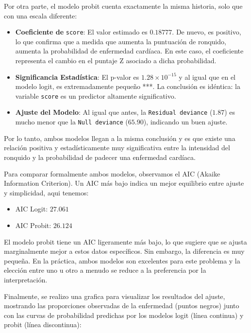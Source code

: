 Por otra parte, el modelo probit cuenta exactamente la misma historia, solo que con una escala diferente:

\begin{itemize}
    \item \textbf{Coeficiente de} \texttt{score}: El valor estimado es $0.18777$. De nuevo, es positivo, lo que confirma que a medida que aumenta la puntuación de ronquido, aumenta la probabilidad de enfermedad cardíaca. En este caso, el coeficiente representa el cambio en el puntaje Z asociado a dicha probabilidad.
    
    \item \textbf{Significancia Estadística}: El p-valor es $1.28 \times 10^{-15}$ y al igual que en el modelo logit, es extremadamente pequeño ***. La conclusión es idéntica: la variable \texttt{score} es un predictor altamente significativo.
    
    \item \textbf{Ajuste del Modelo}: Al igual que antes, la \texttt{Residual deviance} ($1.87$) es mucho menor que la \texttt{Null deviance} ($65.90$), indicando un buen ajuste.
\end{itemize}

\begin{tcolorbox}
Por lo tanto, ambos modelos llegan a la misma conclusión y es que existe una relación positiva y estadísticamente muy significativa entre la intensidad del ronquido y la probabilidad de padecer una enfermedad cardíaca.
\end{tcolorbox}

Para comparar formalmente ambos modelos, observamos el AIC (Akaike Information Criterion). Un AIC más bajo indica un mejor equilibrio entre ajuste y simplicidad, aqui tenemos:
\begin{itemize}
    \item AIC Logit: $27.061$
    \item AIC Probit: $26.124$
\end{itemize}
El modelo probit tiene un AIC ligeramente más bajo, lo que sugiere que se ajusta marginalmente mejor a estos datos específicos. Sin embargo, la diferencia es muy pequeña. En la práctica, ambos modelos son excelentes para este problema y la elección entre uno u otro a menudo se reduce a la preferencia por la interpretación.

Finalmente, se realizo una grafica para visualizar los resultados del ajuste, mostrando las proporciones observadas de la enfermedad (puntos negros) junto con las curvas de probabilidad predichas por los modelos logit (línea continua) y probit (línea discontinua):

